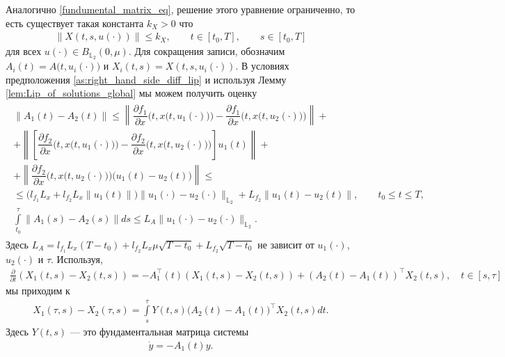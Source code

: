 \documentclass[../main.tex]{subfiles}
\begin{document}
		Аналогично \eqref{fundumental_matrix_eq}, решение этого уравнение ограниченно, то есть существует такая константа $k_X>0$ что
		\begin{gather*}
			\| X(t,s, u(\cdot)) \| \leqslant k_X, \qquad t \in [t_0,T], \qquad s \in [t_0,T]
		\end{gather*}
		для всех $u(\cdot) \in B_{\mathbb{L}_2}(0,\mu)$. 
		Для сокращения записи, обозначим $A_i(t) = A\big(t, u_i(\cdot)\big) $ и $ X_i(t,s) = X(t, s, u_i(\cdot))$. 
		В условиях предположения \ref{as:right_hand_side_diff_lip} и используя Лемму \ref{lem:Lip_of_solutions_global} мы можем получить оценку
		\begin{gather}\label{sec1:lip_a}
			\begin{gathered}
				\| A_1(t) - A_2(t) \| \leqslant 
				\left\| \dfrac{\partial f_1}{\partial x} \Big(t,x\big(t,u_1(\cdot)\big)\Big) - \dfrac{\partial f_1}{\partial x} \Big(t,x\big(t,u_2(\cdot)\big)\Big) \right\| + \\ +
				\left\| \left[ \dfrac{\partial f_2}{\partial x}\Big(t,x\big(t,u_1(\cdot)\big)\Big)  - \dfrac{\partial f_2}{\partial x}\Big(t,x\big(t,u_2(\cdot)\big)\Big) \right] u_1(t) \right\| + \\ +
				\left\| \dfrac{\partial f_2}{\partial x}\Big(t,x\big(t,u_2(\cdot)\big)\Big) \Big(u_1(t) - u_2(t)\Big) \right\| \leqslant \\ \leqslant
				\Big(l_{f_1} L_x  + l_{f_2} L_x \|u_1(t) \|\Big) \| u_1(\cdot) - u_2(\cdot) \|_{\mathbb{L}_2} +  L_{f_2} \| u_1(t) - u_2(t) \|, \qquad t_0 \leqslant t \leqslant T,\\
				\int\limits_{t_0}^{\tau} \|A_1(s) - A_2(s) \| ds \leqslant L_A \| u_1(\cdot) - u_2(\cdot) \|_{\mathbb{L}_2}. 
			\end{gathered}
		\end{gather}
		Здесь $L_A = l_{f_1} L_x (T - t_0) + l_{f_2} L_x \mu \sqrt{T - t_0} + L_{f_2} \sqrt{T - t_0}$ не зависит от $u_1(\cdot)$, $u_2(\cdot)$ и $\tau$. Используя,
		\begin{gather*}
			\frac{\partial}{\partial t} \left(X_1(t,s) - X_2(t,s) \right) = -A_1^{\top}(t) \left(X_1(t,s) - X_2(t,s) \right) + (A_2(t) - A_1(t))^{\top} X_2(t,s), \quad t \in [s,\tau]
		\end{gather*}
		мы приходим к
		\begin{gather*}
			X_1(\tau,s) - X_2(\tau,s) = \int\limits_s^{\tau} Y(t,s) \big(A_2(t) - A_1(t)\big)^{\top} X_2(t,s) dt.
		\end{gather*}
		Здесь $Y(t,s)$ --- это фундаментальная матрица системы 
		\begin{gather*}
			\dot{y} = -A_1(t) y.
		\end{gather*}
\end{document}
